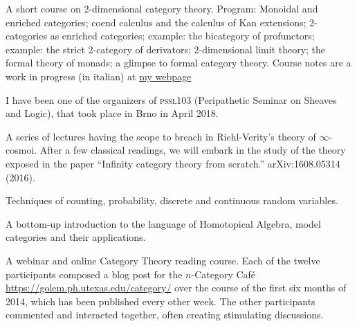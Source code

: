 \begin{eyenumerate}
   \item {}
   {A short course on 2-dimensional category theory. Program: Monoidal and enriched categories; coend calculus and the calculus of Kan extensions; 2-categories as enriched categories; example: the bicategory of profunctors; example: the strict 2-category of derivators; 2-dimensional limit theory; the formal theory of monads; a glimpse to formal category theory. Course notes are a work in progress (in italian) at \href{http://www.math.muni.cz/~loregianf/2kan/_site/index.html}{my webpage}}
   \item {}
   {I have been one of the organizers of \textsc{pssl}103 (Peripathetic Seminar on Sheaves and Logic), that took place in Brno in April 2018.}
   \item {}
   {A series of lectures having the scope to breach in Riehl-Verity's theory of $\infty$-cosmoi. After a few classical readings, we will embark in the study of the theory exposed in the paper ``Infinity category theory from scratch.'' arXiv:1608.05314 (2016).}
   \item {}
   {Techniques of counting, probability, discrete and continuous random variables.}
   \item {}
   {A bottom-up introduction to the language of Homotopical Algebra, model categories and their applications.}
   \item {}
   {A webinar and online Category Theory reading course. Each of the twelve participants composed a blog post for the $n$-Category Caf\'e \url{https://golem.ph.utexas.edu/category/} over the course of the first six months of 2014, which has been published every other week. The other participants commented and interacted together, often creating stimulating discussions.}
\end{eyenumerate}
